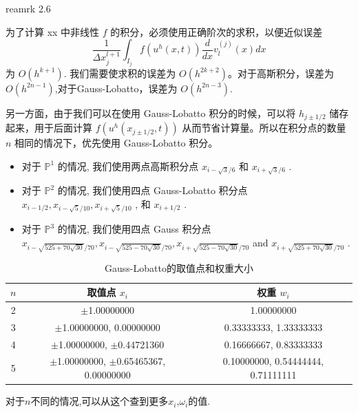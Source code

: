 \documentclass{book}
\begin{document}
\cite{RKDG2} reamrk 2.6


为了计算 xx 中非线性 $f$ 的积分，必须使用正确阶次的求积，以便近似误差
\begin{equation}
  \frac{1}{\Delta x_{j}^{l+1}} \int_{I_{j}} f\left(u^{h}(x, t)\right) \frac{d}{d x} v_{l}^{(j)}(x) d x
\end{equation}
为 $O\left(h^{k+1}\right)$. 我们需要使求积的误差为 $O\left(h^{2 k+2}\right)$。对于高斯积分，误差为 $O\left(h^{2n-1}\right)$,对于Gauss-Lobatto，误差为 $O\left(h^{2n-3}\right)$.

另一方面，由于我们可以在使用 Gauss-Lobatto 积分的时候，可以将 $h_{j \pm 1 / 2}$  储存起来，用于后面计算  $f\left(u^{h}\left(x_{j \pm 1 / 2}, t\right)\right)$ 从而节省计算量。所以在积分点的数量 $n$ 相同的情况下，优先使用  Gauss-Lobatto 积分。

\begin{itemize}
  \item 对于  $\mathbb{P}^{1}$  的情况, 我们使用两点高斯积分点  $x_{i-\sqrt{3} / 6}$  和  $x_{i+\sqrt{3} / 6}$ .
  \item 对于  $\mathbb{P}^{2}$  的情况, 我们使用四点 Gauss-Lobatto 积分点  $x_{i-1 / 2}, x_{i-\sqrt{5} / 10}, x_{i+\sqrt{5} / 10}$ , 和  $x_{i+1 / 2}$ .
  \item 对于  $\mathbb{P}^{3}$  的情况, 我们使用四点 Gauss 积分点  $x_{i-\sqrt{525+70 \sqrt{30}} / 70}, x_{i-\sqrt{525-70 \sqrt{30}} / 70}, x_{i+\sqrt{525-70 \sqrt{30}} / 70}$  and  $x_{i+\sqrt{525+70 \sqrt{30}} / 70}$ .
\end{itemize}

\begin{table}[ht]
  \centering
  \caption{Gauss-Lobatto的取值点和权重大小}
  \label{tab:Gauss-Lobatto积分}
  \begin{tabular}{ccc}
    \toprule
    $n$ & 取值点 $x_i$                                 & 权重 $w_i$                         \\
    \midrule
    2   & $\pm$1.00000000                              & 1.00000000                         \\
    3   & $\pm$1.00000000, 0.00000000                  & 0.33333333, 1.33333333             \\
    4   & $\pm$1.00000000, $\pm$0.44721360             & 0.16666667, 0.83333333             \\
    5   & $\pm$1.00000000, $\pm$0.65465367, 0.00000000 & 0.10000000, 0.54444444, 0.71111111 \\
    \bottomrule
  \end{tabular}
\end{table}
对于$n$不同的情况,可以从这个\cite{RN106}查到更多$x_i$,$\omega_i$的值.
\end{document}
